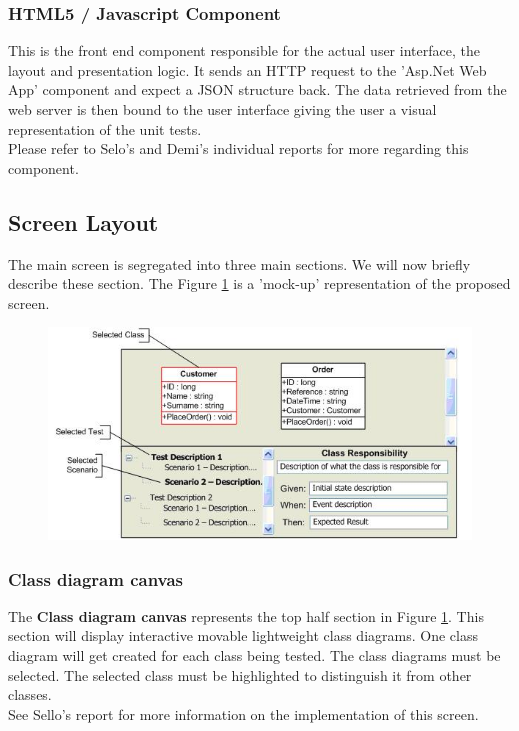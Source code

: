 \documentclass[a4paper,12pt]{article}
\begin{document}
\subsubsection{HTML5 / Javascript Component}
This is the front end component responsible for the actual user interface, the layout and presentation logic. It sends an HTTP request to the 'Asp.Net Web App' component and expect a JSON\cite{json} structure back. The data retrieved from the web server is then bound to the user interface giving the user a visual representation of the unit tests.\\
\linebreak
Please refer to Selo's\cite{selo} and Demi's\cite{demi} individual reports for more regarding this component.

\subsection{Screen Layout}
The main screen is segregated into three main sections. We will now briefly describe these section. The Figure \ref{fig2} is a 'mock-up' representation of the proposed screen. 


\begin{center}
	\begin{figure}
		\includegraphics{screenmock.JPG}
			\caption{}
			\label{fig2}    
	\end{figure}	
\end{center}


\subsubsection{Class diagram canvas}
The \textbf{Class diagram canvas} represents the top half section in Figure \ref{fig2}. This section will display interactive movable lightweight class diagrams. One class diagram will get created for each class being tested. The class diagrams must be selected. The selected class must be highlighted to distinguish it from other classes.\\
\linebreak 
See Sello’s\cite{sello} report for more information on the implementation of this screen.
\end{document}
